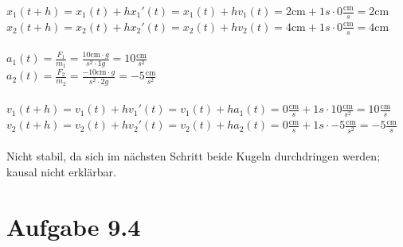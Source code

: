 \documentclass[DIV12]{scrartcl}
\begin{document}
\(x_1(t+h)=x_1(t)+h x_1'(t)=x_1(t)+h v_1(t)=2\text{cm} +1 s \cdot 0\frac{\text{cm}}{s}=2\text{cm}\)\\
\(x_2(t+h)=x_2(t)+h x_2'(t)=x_2(t)+h v_2(t)=4\text{cm} +1 s \cdot 0\frac{\text{cm}}{s}=4\text{cm}\)
\\\\
\(a_1(t)=\frac{F_1}{m_1}=\frac{10\text{cm} \cdot g}{s^2\cdot1 g}=10 \frac{\text{cm}}{s^2}\)\\
\(a_2(t)=\frac{F_2}{m_2}=\frac{-10\text{cm} \cdot g}{s^2\cdot2 g}=-5 \frac{\text{cm}}{s^2}\)
\\\\
\(v_1(t+h)=v_1(t)+h v_1'(t)=v_1(t)+h a_1(t)=0\frac{\text{cm}}{s}+1s\cdot10\frac{\text{cm}}{s^2}=10\frac{\text{cm}}{s}\)\\
\(v_2(t+h)=v_2(t)+h v_2'(t)=v_2(t)+h a_2(t)=0\frac{\text{cm}}{s}+1s\cdot-5\frac{\text{cm}}{s^2}=-5\frac{\text{cm}}{s}\)
\\\\
Nicht stabil, da sich im n{\" a}chsten Schritt beide Kugeln durchdringen werden; kausal nicht erkl{\" a}rbar.

\section*{Aufgabe 9.4}
\end{document}
